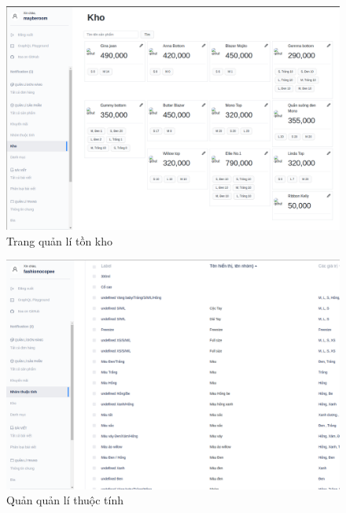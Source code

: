 \clearpage
\FloatBarrier
\begin{figure}[!htbp]\fontsize{13px}{13px}\selectfont
	\begin{center}	
		\includegraphics[width=\textwidth]{./results/stock}
		\caption{Trang quản lí tồn kho}
	\end{center}
\end{figure}
\clearpage
\FloatBarrier
\begin{figure}[!htbp]\fontsize{13px}{13px}\selectfont
	\begin{center}	
		\includegraphics[width=\textwidth]{./results/attributes}
		\caption{Quản quản lí thuộc tính}
	\end{center}
\end{figure}
\clearpage
\FloatBarrier
